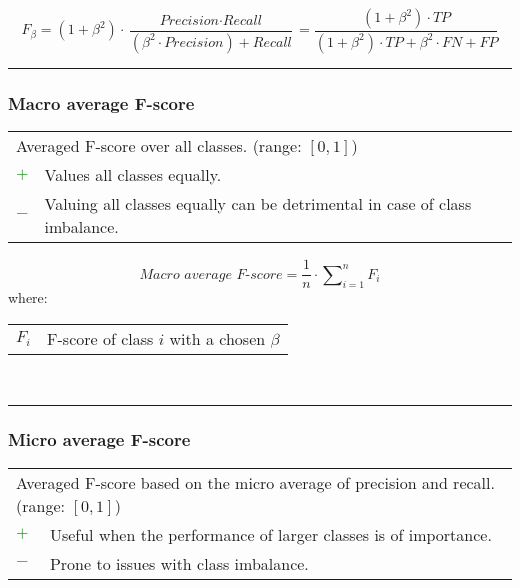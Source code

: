 \documentclass{article}
\makeatletter
\newenvironment{conditions}[1][where:]
	{\hspace{0.02\textwidth} #1 \begin{tabular}[t]{>{$}l<{$} @{${}={}$} l}}
	{\end{tabular}\\[\belowdisplayskip]}
\makeatother
\begin{document}
\begin{equation}
	F_\beta = (1 + \beta^2) \cdot \dfrac{\textit{Precision} \cdot \textit{Recall}}{(\beta^2 \cdot \textit{Precision}) + \textit{Recall}} = \dfrac{(1 + \beta^2) \cdot \textit{TP}}{(1 + \beta^2) \cdot \textit{TP} + \beta^2 \cdot \textit{FN} + \textit{FP}}
%
	\label{equation:F-score}
\end{equation}

\hrule


\subsubsection[Macro average F-score]{Macro average F-score \cite{mohammad2013nrc, takahashi2022confidence}}

\begin{table}[H]\centering
	\begin{tabular}{m{}m{}}
		\multicolumn{2}{m{0.95\textwidth}}{Averaged F-score over all classes. (range: $[0, 1]$)} \\
		\textcolor{Green}{$+$} & Values all classes equally. \\
		\textcolor{Red}{$-$}   & Valuing all classes equally can be detrimental in case of class imbalance.
	\end{tabular}
\end{table}

\begin{equation}
	\textit{Macro average F-score} = \dfrac{1}{\textit{n}} \cdot \sum\nolimits_{i = 1}^n \textit{F}_i
%
	\label{equation:MAAF}
\end{equation}
%
\begin{conditions}
	F_i & F-score of class $i$ with a chosen $\beta$
\end{conditions}

\hrule


\subsubsection[Micro average F-score]{Micro average F-score \cite{goutte2005probabilistic, takahashi2022confidence}}

\begin{table}[H]\centering
	\begin{tabular}{m{}m{}}
		\multicolumn{2}{m{0.95\textwidth}}{Averaged F-score based on the micro average of precision and recall. (range: $[0, 1]$)} \\
		\textcolor{Green}{$+$} & Useful when the performance of larger classes is of importance. \\
		\textcolor{Red}{$-$}   & Prone to issues with class imbalance.
	\end{tabular}
\end{table}
\end{document}
